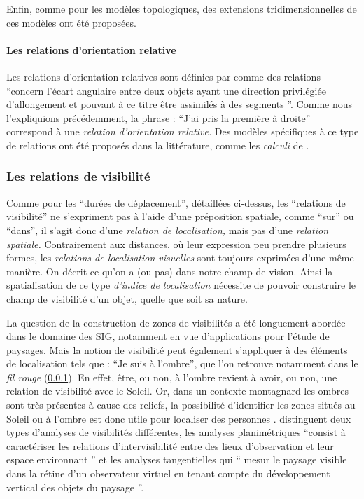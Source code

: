 Enfin, comme pour les modèles topologiques, des extensions
tridimensionnelles de ces modèles ont été proposées.


\paragraph{Les relations d'orientation relative}


Les relations d'orientation relatives sont définies par
\textcite{Duchene2019} comme des relations
\enquote{concern l'écart angulaire entre deux objets
  ayant une direction privilégiée d'allongement et pouvant à ce titre
  être assimilés à des segments \textelp{}}. Comme nous l'expliquions
précédemment, la phrase : \enquote{J'ai pris la première à droite}
correspond à une \emph{relation d'orientation relative.} Des modèles
spécifiques à ce type de relations ont été proposés dans la
littérature, comme les \emph{calculi} de
\textcite{Schlider1995,Isli2000}.

\subsubsection{Les relations de visibilité}

Comme pour les \enquote{durées de déplacement}, détaillées ci-dessus,
les \enquote{relations de visibilité} ne s'expriment pas à l'aide
d'une préposition spatiale, comme \enquote{sur} ou \enquote{dans}, il
s'agit donc d'une \emph{relation de localisation,} mais pas d'une
\emph{relation spatiale.} Contrairement aux distances, où leur
expression peu prendre plusieurs formes, les \emph{relations de
  localisation visuelles} sont toujours exprimées d'une même
manière. On décrit ce qu'on a (ou pas) dans notre champ de
vision. Ainsi la spatialisation de ce type \emph{d'indice de
  localisation} nécessite de pouvoir construire le champ de visibilité
d'un objet, quelle que soit sa nature.

La question de la construction de zones de visibilités a été
longuement abordée dans le domaine des SIG, notamment en vue
d’applications pour l'étude de paysages. Mais la notion de visibilité
peut également s'appliquer à des éléments de localisation tels que :
\enquote{Je suis à l'ombre}, que l'on retrouve notamment dans le
\emph{fil rouge} (\ref{}). En effet, être, ou non, à l'ombre revient à
avoir, ou non, une relation de visibilité avec le Soleil. Or, dans un
contexte montagnard les ombres sont très présentes à cause des
reliefs, la possibilité d'identifier les zones situés au Soleil ou à
l'ombre est donc utile pour localiser des personnes
\autocite{Houpert2003}. \textcite{Sahraoui2016} distinguent deux types
d'analyses de visibilités différentes, les analyses planimétriques
\enquote{consist à caractériser les relations
  d’intervisibilité entre des lieux d’observation et leur espace
  environnant \textelp{}} et les analyses tangentielles qui
\enquote{\textelp{} mesur le paysage visible dans la
  rétine d’un observateur virtuel en tenant compte du développement
  vertical des objets du paysage \textelp{}}.

